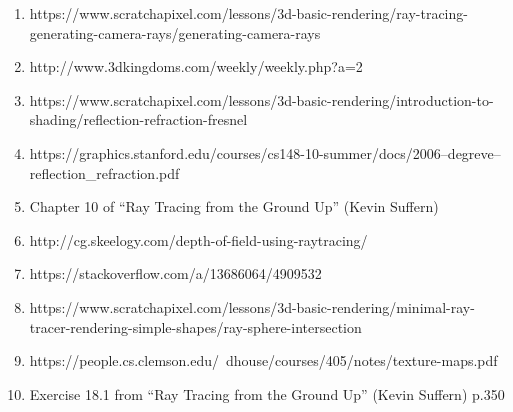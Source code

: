 \documentclass{article}
\begin{document}
\begin{enumerate}
    \item https://www.scratchapixel.com/lessons/3d-basic-rendering/ray-tracing-generating-camera-rays/generating-camera-rays
    \item http://www.3dkingdoms.com/weekly/weekly.php?a=2
    \item https://www.scratchapixel.com/lessons/3d-basic-rendering/introduction-to-shading/reflection-refraction-fresnel
    \item https://graphics.stanford.edu/courses/cs148-10-summer/docs/2006--degreve--reflection\_refraction.pdf
    \item Chapter 10 of ``Ray Tracing from the Ground Up'' (Kevin Suffern)
    \item http://cg.skeelogy.com/depth-of-field-using-raytracing/
    \item https://stackoverflow.com/a/13686064/4909532
    \item https://www.scratchapixel.com/lessons/3d-basic-rendering/minimal-ray-tracer-rendering-simple-shapes/ray-sphere-intersection
    \item https://people.cs.clemson.edu/~dhouse/courses/405/notes/texture-maps.pdf
    \item Exercise 18.1 from ``Ray Tracing from the Ground Up'' (Kevin Suffern) p.350
\end{enumerate}
\end{document}
